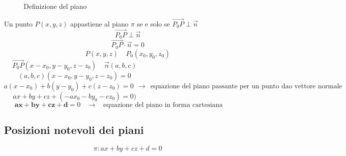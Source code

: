 \documentclass{article}     %
\begin{document}
            \begin{wrapfigure}{r}{0.49\textwidth}
                \begin{center}
                \end{center}
                \caption{Definizione del piano}
            \end{wrapfigure}
            Un punto $P(x,y,z)$ appastiene al piano $\pi$ se e solo se $\overrightarrow{P_0P}\perp \overrightarrow{n}$
            \[\overrightarrow{P_0P}\perp\overrightarrow{n}\]
            \[\overrightarrow{P_0P}\cdot\overrightarrow{n}=0\]
            \[P(x,y,z)~~~~~P_0(x_0,y_0,z_0)\]
            \[\overrightarrow{P_0P}(x-x_0,y-y_0,z-z_0)~~~~~\overrightarrow{n}(a,b,c)~~~~~~~~~~~~~~~~~~~~~~~~~~~~~~~~~~~~~~~~~~~~~~~~~~~~~~~~~~~~~~~~~~~~~~\]
            \[(a,b,c)(x-x_0,y-y_0,z-z_0)=0~~~~~~~~~~~~~~~~~~~~~~~~~~~~~~~~~~~~~~~~~~~~~~~~~~~~~~~~~~~~~~~~~~~~~~\]
            \[a(x-x_0)+b(y-y_0)+c(z-z_0)=0~~\rightarrow~~\text{equazione del piano passante per un punto dao vettore normale}\]
            \[ax+by+cz+(-ax_0-by_0-cz_0)=0)~~~~~~~~~~~~~~~~~~~~~~~~~~~~~~~~~~~~~~~~~~~~~~~~~~~~~~~~~~~~~~~~~~~~~~\]
            \[\mathbf{ax+by+cz+d}=0~~~~\rightarrow~~~~\text{equazione del piano in forma cartesiana}~~~~~~~~~~~~\]

            \subsection{Posizioni notevoli dei piani}
            \[\pi: ax+by+cz+d=0\]
            
\end{document}
